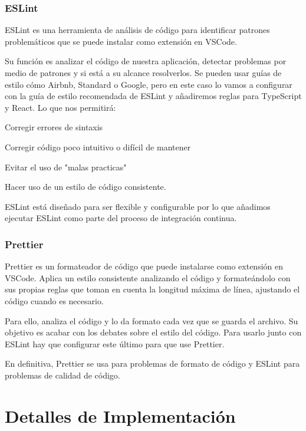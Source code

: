 \documentclass[12pt,twoside,titlepage]{report}
\begin{document}
\subsubsection{ESLint}

ESLint es una herramienta de análisis de código para identificar patrones problemáticos que se puede instalar como extensión en VSCode.

Su función es analizar el código de nuestra aplicación, detectar problemas por medio de patrones y si está a su alcance resolverlos. Se pueden usar guías de estilo cómo Airbnb, Standard o Google, pero en este caso lo vamos a configurar con la guía de estilo recomendada de ESLint y añadiremos reglas para TypeScript y React. Lo que nos permitirá:

\begin{compactitem}
 \item Corregir errores de sintaxis
 \item Corregir código poco intuitivo o difícil de mantener
 \item Evitar el uso de "malas practicas"
 \item Hacer uso de un estilo de código consistente.
\end{compactitem}

ESLint está diseñado para ser flexible y configurable por lo que añadimos ejecutar ESLint como parte del proceso de integración continua.

\subsubsection{Prettier}

Prettier es un formateador de código que puede instalarse como extensión en VSCode. Aplica un estilo consistente analizando el código y formateándolo con sus propias reglas que toman en cuenta la longitud máxima de línea, ajustando el código cuando es necesario.

Para ello, analiza el código y lo da formato cada vez que se guarda el archivo. Su objetivo es acabar con los debates sobre el estilo del código. Para usarlo junto con ESLint hay que configurar este último para que use Prettier.

En definitiva, Prettier se usa para problemas de formato de código y ESLint para problemas de calidad de código.

\section{Detalles de Implementación}
\end{document}
